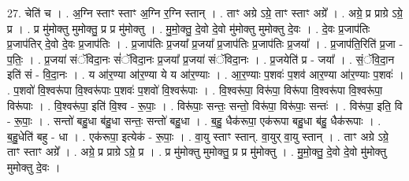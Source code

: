 \documentclass[17pt]{extarticle}
\begin{document}
27. चेति॑ च । . अ॒ग्नि स्ताꣳ स्ताꣳ अ॒ग्नि र॒ग्नि स्तान् । . ताꣳ अग्रे ऽग्रे॒ ताꣳ स्ताꣳ अग्रे᳚ । . अग्रे॒ प्र प्राग्रे ऽग्रे॒ प्र । . प्र मु॑मोक्तु मुमोक्तु॒ प्र प्र मु॑मोक्तु । . मु॒मो॒क्तु॒ दे॒वो दे॒वो मु॑मोक्तु मुमोक्तु दे॒वः । . दे॒वः प्र॒जाप॑तिः प्र॒जाप॑तिर् दे॒वो दे॒वः प्र॒जाप॑तिः । . प्र॒जाप॑तिः प्र॒जया᳚ प्र॒जया᳚ प्र॒जाप॑तिः प्र॒जाप॑तिः प्र॒जया᳚ । . प्र॒जाप॑ति॒रिति॑ प्र॒जा - प॒तिः॒ । . प्र॒जया॑ संॅविदा॒नः सं॑ॅविदा॒नः प्र॒जया᳚ प्र॒जया॑ संॅविदा॒नः । . प्र॒जयेति॑ प्र - जया᳚ । . सं॒ॅवि॒दा॒न इति॑ सं - वि॒दा॒नः । . य आ॑र॒ण्या आ॑र॒ण्या ये य आ॑र॒ण्याः । . आ॒र॒ण्याः प॒शवः॑ प॒शव॑ आर॒ण्या आ॑र॒ण्याः प॒शवः॑ । . प॒शवो॑ वि॒श्वरू॑पा वि॒श्वरू॑पाः प॒शवः॑ प॒शवो॑ वि॒श्वरू॑पाः । . वि॒श्वरू॑पा॒ विरू॑पा॒ विरू॑पा वि॒श्वरू॑पा वि॒श्वरू॑पा॒ विरू॑पाः । . वि॒श्वरू॑पा॒ इति॑ वि॒श्व - रू॒पाः॒ । . विरू॑पाः॒ सन्तः॒ सन्तो॒ विरू॑पा॒ विरू॑पाः॒ सन्तः॑ । . विरू॑पा॒ इति॒ वि - रू॒पाः॒ । . सन्तो॑ बहु॒धा ब॑हु॒धा सन्तः॒ सन्तो॑ बहु॒धा । . ब॒हु॒ धैक॑रूपा॒ एक॑रूपा बहु॒धा ब॑हु॒ धैक॑रूपाः । . ब॒हु॒धेति॑ बहु - धा । . एक॑रूपा॒ इत्येक॑ - रू॒पाः॒ । . वा॒यु स्ताꣳ स्तान्. वा॒युर् वा॒यु स्तान् । . ताꣳ अग्रे ऽग्रे॒ ताꣳ स्ताꣳ अग्रे᳚ । . अग्रे॒ प्र प्राग्रे ऽग्रे॒ प्र । . प्र मु॑मोक्तु मुमोक्तु॒ प्र प्र मु॑मोक्तु । . मु॒मो॒क्तु॒ दे॒वो दे॒वो मु॑मोक्तु मुमोक्तु दे॒वः । \newline
\end{document}
